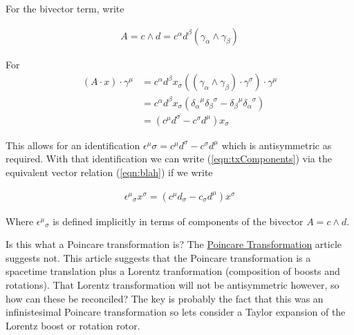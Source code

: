 \documentclass{article}
\begin{document}
For the bivector term, write

\begin{align*}
A = c \wedge d = c^\alpha d^\beta (\gamma_\alpha \wedge \gamma_\beta)
\end{align*}

For
\begin{align*}
(A \cdot x ) \cdot \gamma^\mu 
&=
c^\alpha d^\beta x_\sigma ((\gamma_\alpha \wedge \gamma_\beta) \cdot \gamma^\sigma) \cdot \gamma^\mu \\
&=
c^\alpha d^\beta x_\sigma ( {\delta_\alpha}^\mu {\delta_\beta}^\sigma -{\delta_\beta}^\mu {\delta_\alpha}^\sigma ) \\
&=
(c^\mu d^\sigma -c^\sigma d^\mu ) x_\sigma 
\end{align*}

This allows for an identification $\epsilon^\mu\sigma = c^\mu d^\sigma -c^\sigma d^\mu$ which is antisymmetric as required.
With that identification we can write (\ref{eqn:txComponents}) via the equivalent vector relation (\ref{eqn:blah}) if
we write

\begin{align*}
{\epsilon^\mu}_\sigma x^\sigma = (c^\mu d_\sigma -c_\sigma d^\mu ) x^\sigma 
\end{align*}

Where ${\epsilon^\mu}_\sigma$ is defined implicitly in terms of components of the bivector $A = c \wedge d$.

Is this what a Poincare transformation is?  The \href{http://mathworld.wolfram.com/PoincareTransformation.html}{Poincare Transformation} article suggests not.  This article suggests that the Poincare transformation is a spacetime translation plus
a Lorentz tranformation (composition of boosts and rotations).  That Lorentz transformation will not be antisymmetric
however, so how can these be reconciled?  The key is probably the fact that this was an infinistesimal Poincare transformation
so lets consider a Taylor expansion of the Lorentz boost or rotation rotor.



\end{document}
